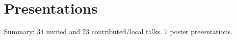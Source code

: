 \documentclass[11pt,a4paper,sans]{moderncv}        %
\begin{document}
%




\section{Presentations}
Summary: 34 invited and 23 contributed/local talks. 7 poster presentations.
\end{document}
